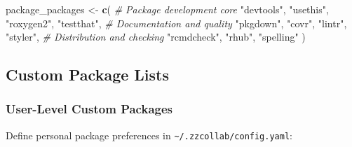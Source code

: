 \documentclass[
]{article}
\newenvironment{Shaded}{\begin{snugshade}}{\end{snugshade}}
\newcommand{\CommentTok}[1]{\textcolor[rgb]{0.56,0.35,0.01}{\textit{#1}}}
\newcommand{\FunctionTok}[1]{\textcolor[rgb]{0.13,0.29,0.53}{\textbf{#1}}}
\newcommand{\NormalTok}[1]{#1}
\newcommand{\OtherTok}[1]{\textcolor[rgb]{0.56,0.35,0.01}{#1}}
\newcommand{\StringTok}[1]{\textcolor[rgb]{0.31,0.60,0.02}{#1}}
\begin{document}
\begin{Shaded}
\begin{Highlighting}[]
\NormalTok{package\_packages }\OtherTok{\textless{}{-}} \FunctionTok{c}\NormalTok{(}
  \CommentTok{\# Package development core}
  \StringTok{"devtools"}\NormalTok{, }\StringTok{"usethis"}\NormalTok{, }\StringTok{"roxygen2"}\NormalTok{, }\StringTok{"testthat"}\NormalTok{,}
  \CommentTok{\# Documentation and quality}
  \StringTok{"pkgdown"}\NormalTok{, }\StringTok{"covr"}\NormalTok{, }\StringTok{"lintr"}\NormalTok{, }\StringTok{"styler"}\NormalTok{,}
  \CommentTok{\# Distribution and checking}
  \StringTok{"rcmdcheck"}\NormalTok{, }\StringTok{"rhub"}\NormalTok{, }\StringTok{"spelling"}
\NormalTok{)}
\end{Highlighting}
\end{Shaded}

\subsection{Custom Package Lists}\label{custom-package-lists}

\subsubsection{User-Level Custom
Packages}\label{user-level-custom-packages}

Define personal package preferences in
\texttt{\textasciitilde{}/.zzcollab/config.yaml}:
\end{document}
